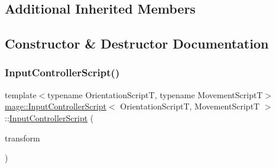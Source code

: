 \subsection*{Additional Inherited Members}


\subsection{Constructor \& Destructor Documentation}
\hypertarget{classmage_1_1_input_controller_script_adf1edb71170cb5184f201a64ad7455cb}{}\label{classmage_1_1_input_controller_script_adf1edb71170cb5184f201a64ad7455cb} 
\subsubsection{\texorpdfstring{Input\+Controller\+Script()}{InputControllerScript()}\hspace{0.1cm}{\footnotesize\ttfamily [1/3]}}
{\footnotesize\ttfamily template$<$typename Orientation\+ScriptT, typename Movement\+ScriptT$>$ \\
\hyperlink{classmage_1_1_input_controller_script}{mage\+::\+Input\+Controller\+Script}$<$ Orientation\+ScriptT, Movement\+ScriptT $>$\+::\hyperlink{classmage_1_1_input_controller_script}{Input\+Controller\+Script} (\begin{DoxyParamCaption}\item[{\hyperlink{structmage_1_1_transform_node}{Transform\+Node} $\ast$}]{transform }\end{DoxyParamCaption})\hspace{0.3cm}{\ttfamily [explicit]}}

\hypertarget{classmage_1_1_input_controller_script_a22de786b39180e18b8565b211797388d}{}\label{classmage_1_1_input_controller_script_a22de786b39180e18b8565b211797388d} 
